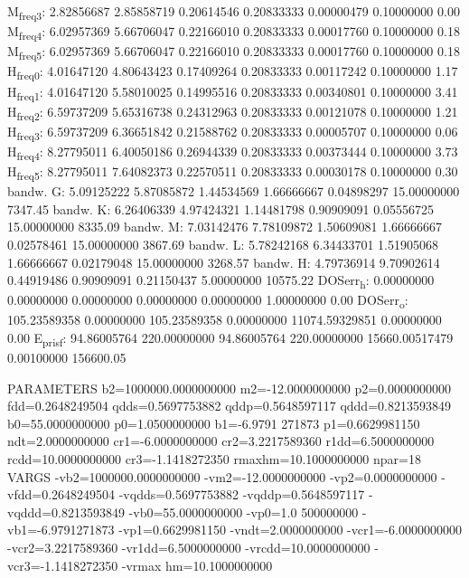 \documentclass[11pt]{article}
\begin{document}
M\textsubscript{freq}\textsubscript{3}:   2.82856687   2.85858719   0.20614546   0.20833333   0.00000479   0.10000000         0.00
M\textsubscript{freq}\textsubscript{4}:   6.02957369   5.66706047   0.22166010   0.20833333   0.00017760   0.10000000         0.18
M\textsubscript{freq}\textsubscript{5}:   6.02957369   5.66706047   0.22166010   0.20833333   0.00017760   0.10000000         0.18
H\textsubscript{freq}\textsubscript{0}:   4.01647120   4.80643423   0.17409264   0.20833333   0.00117242   0.10000000         1.17
H\textsubscript{freq}\textsubscript{1}:   4.01647120   5.58010025   0.14995516   0.20833333   0.00340801   0.10000000         3.41
H\textsubscript{freq}\textsubscript{2}:   6.59737209   5.65316738   0.24312963   0.20833333   0.00121078   0.10000000         1.21
H\textsubscript{freq}\textsubscript{3}:   6.59737209   6.36651842   0.21588762   0.20833333   0.00005707   0.10000000         0.06
H\textsubscript{freq}\textsubscript{4}:   8.27795011   6.40050186   0.26944339   0.20833333   0.00373444   0.10000000         3.73
H\textsubscript{freq}\textsubscript{5}:   8.27795011   7.64082373   0.22570511   0.20833333   0.00030178   0.10000000         0.30
bandw. G:   5.09125222   5.87085872   1.44534569   1.66666667   0.04898297  15.00000000      7347.45
bandw. K:   6.26406339   4.97424321   1.14481798   0.90909091   0.05556725  15.00000000      8335.09
bandw. M:   7.03142476   7.78109872   1.50609081   1.66666667   0.02578461  15.00000000      3867.69
bandw. L:   5.78242168   6.34433701   1.51905068   1.66666667   0.02179048  15.00000000      3268.57
bandw. H:   4.79736914   9.70902614   0.44919486   0.90909091   0.21150437   5.00000000     10575.22
DOSerr\textsubscript{h}:   0.00000000   0.00000000   0.00000000   0.00000000   0.00000000   1.00000000         0.00
DOSerr\textsubscript{o}: 105.23589358   0.00000000 105.23589358   0.00000000 11074.59329851   0.00000000         0.00
E\textsubscript{pris}\textsubscript{f}:  94.86005764 220.00000000  94.86005764 220.00000000 15660.00517479
0.00100000    156600.05


PARAMETERS
  b2=1000000.0000000000 m2=-12.0000000000 p2=0.0000000000 fdd=0.2648249504 qdds=0.5697753882 qddp=0.5648597117 qddd=0.8213593849 b0=55.0000000000 p0=1.0500000000 b1=-6.9791
271873 p1=0.6629981150 ndt=2.0000000000 cr1=-6.0000000000 cr2=3.2217589360 r1dd=6.5000000000 rcdd=10.0000000000 cr3=-1.1418272350 rmaxhm=10.1000000000 npar=18 
VARGS
    -vb2=1000000.0000000000 -vm2=-12.0000000000 -vp2=0.0000000000 -vfdd=0.2648249504 -vqdds=0.5697753882 -vqddp=0.5648597117 -vqddd=0.8213593849 -vb0=55.0000000000 -vp0=1.0
500000000 -vb1=-6.9791271873 -vp1=0.6629981150 -vndt=2.0000000000 -vcr1=-6.0000000000 -vcr2=3.2217589360 -vr1dd=6.5000000000 -vrcdd=10.0000000000 -vcr3=-1.1418272350 -vrmax
hm=10.1000000000 
\end{document}
